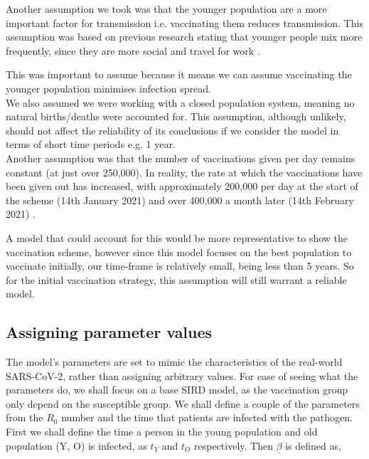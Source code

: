 \documentclass{article}
\begin{document}
\noindent
Another assumption we took was that the younger population are a more important factor for transmission i.e. vaccinating them reduces transmission. This assumption was based on previous research stating that younger people mix more frequently, since they are more social and travel for work \cite{Youngperoplespreadshit}. 

This was important to assume because it means we can assume vaccinating the younger population minimises infection spread.\\

\noindent
We also assumed we were working with a closed population system, meaning no natural births/deaths were accounted for. This assumption, although unlikely, should not affect the reliability of its conclusions if we consider the model in terms of short time periods e.g. 1 year.\\

\noindent
Another assumption was that the number of vaccinations given per day remains constant (at just over 250,000). In reality, the rate at which the vaccinations have been given out has increased, with approximately 200,000 per day at the start of the scheme (14th January 2021) and over 400,000 a month later (14th February 2021) \cite{ukgov}.

A model that could account for this would be more representative to show the vaccination scheme, however since this model focuses on the best population to vaccinate initially, our time-frame is relatively small, being less than 5 years. So for the initial vaccination strategy, this assumption will still warrant a reliable model.



\subsection{Assigning parameter values}
\noindent
The model's parameters are set to mimic the characteristics of the real-world SARS-CoV-2, rather than assigning arbitrary values. For ease of seeing what the parameters do, we shall focus on a base SIRD model, as the vaccination group only depend on the susceptible group. We shall define a couple of the parameters from the $R_0$ number and the time that patients are infected with the pathogen. \\


\noindent
First we shall define the time a person in the young population and old population (Y, O) is infected, as $t_Y$ and $t_O$ respectively. Then $\underline{\beta}$ is defined as,
\end{document}
